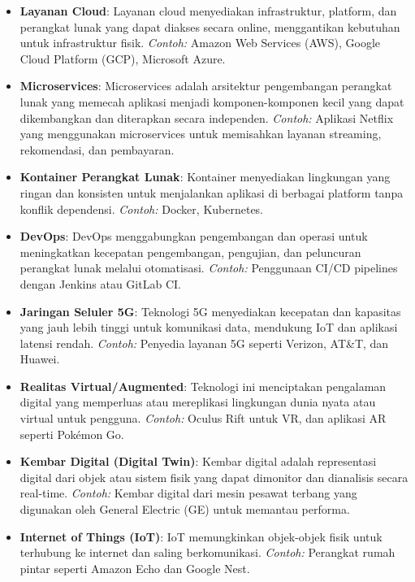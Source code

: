 \begin{itemize}
	\item \textbf{Layanan Cloud}: Layanan cloud menyediakan infrastruktur, platform, dan perangkat lunak yang dapat diakses secara online, menggantikan kebutuhan untuk infrastruktur fisik. \emph{Contoh:} Amazon Web Services (AWS), Google Cloud Platform (GCP), Microsoft Azure.
	
	\item \textbf{Microservices}: Microservices adalah arsitektur pengembangan perangkat lunak yang memecah aplikasi menjadi komponen-komponen kecil yang dapat dikembangkan dan diterapkan secara independen. \emph{Contoh:} Aplikasi Netflix yang menggunakan microservices untuk memisahkan layanan streaming, rekomendasi, dan pembayaran.
	
	\item \textbf{Kontainer Perangkat Lunak}: Kontainer menyediakan lingkungan yang ringan dan konsisten untuk menjalankan aplikasi di berbagai platform tanpa konflik dependensi. \emph{Contoh:} Docker, Kubernetes.
	
	\item \textbf{DevOps}: DevOps menggabungkan pengembangan dan operasi untuk meningkatkan kecepatan pengembangan, pengujian, dan peluncuran perangkat lunak melalui otomatisasi. \emph{Contoh:} Penggunaan CI/CD pipelines dengan Jenkins atau GitLab CI.
	
	\item \textbf{Jaringan Seluler 5G}: Teknologi 5G menyediakan kecepatan dan kapasitas yang jauh lebih tinggi untuk komunikasi data, mendukung IoT dan aplikasi latensi rendah. \emph{Contoh:} Penyedia layanan 5G seperti Verizon, AT\&T, dan Huawei.
	
	\item \textbf{Realitas Virtual/Augmented}: Teknologi ini menciptakan pengalaman digital yang memperluas atau mereplikasi lingkungan dunia nyata atau virtual untuk pengguna. \emph{Contoh:} Oculus Rift untuk VR, dan aplikasi AR seperti Pokémon Go.
	
	\item \textbf{Kembar Digital (Digital Twin)}: Kembar digital adalah representasi digital dari objek atau sistem fisik yang dapat dimonitor dan dianalisis secara real-time. \emph{Contoh:} Kembar digital dari mesin pesawat terbang yang digunakan oleh General Electric (GE) untuk memantau performa.
	
	\item \textbf{Internet of Things (IoT)}: IoT memungkinkan objek-objek fisik untuk terhubung ke internet dan saling berkomunikasi. \emph{Contoh:} Perangkat rumah pintar seperti Amazon Echo dan Google Nest.
	

\end{itemize}
